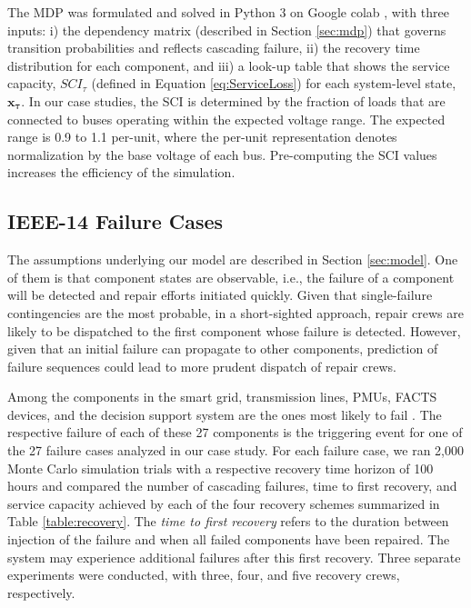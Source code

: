\documentclass[runningheads]{llncs}
\begin{document}
The MDP was formulated and solved in Python 3 on Google colab \cite{colab}, with three inputs: i) the dependency matrix (described in Section \ref{sec:mdp}) that governs transition probabilities and reflects cascading failure, ii) the recovery time distribution for each component, and iii) a look-up table that shows the service capacity, $SCI_\tau$ (defined in Equation \ref{eq:ServiceLoss}) for each system-level state, $\mathbf{x_\tau}$. In our case studies, the SCI is determined by the fraction of loads that are connected to buses operating within the expected voltage range. The expected range is 0.9 to 1.1 per-unit, where the per-unit representation denotes normalization by the base voltage of each bus. Pre-computing the SCI values increases the efficiency of the simulation. %
\subsection{IEEE-14 Failure Cases}
The assumptions underlying our model are described in Section \ref{sec:model}. One of them is that component states are observable, i.e., the failure of a component will be detected and repair efforts initiated quickly. Given that single-failure contingencies are the most probable, in a short-sighted approach, repair crews are likely to be dispatched to the first component whose failure is detected. However, given that an initial failure can propagate to other components, prediction of failure sequences could lead to more prudent dispatch of repair crews. 

Among the components in the smart grid, transmission lines, PMUs, FACTS devices, and the decision support system are the ones most likely to fail \cite{song_survey_2013}. The respective failure of each of these 27 components is the triggering event for one of the 27 failure cases analyzed in our case study. For each failure case, we ran 2,000 Monte Carlo simulation trials with a respective recovery time horizon of 100 hours and compared the number of cascading failures, time to first recovery, and service capacity achieved by each of the four recovery schemes summarized in Table \ref{table:recovery}. The \emph{time to first recovery} refers to the duration between injection of the failure and when all failed components have been repaired. The system may experience additional failures after this first recovery. Three separate experiments were conducted, with three, four, and five recovery crews, respectively.
\end{document}
